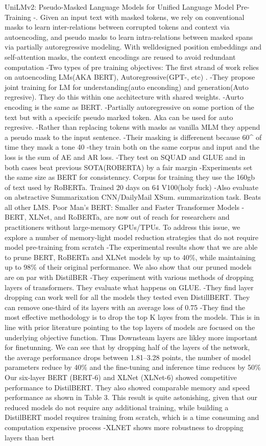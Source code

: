 UniLMv2: Pseudo-Masked Language Models for Unified Language Model Pre-Training
-. Given an input text with
masked tokens, we rely on conventional masks
to learn inter-relations between corrupted tokens
and context via autoencoding, and pseudo masks
to learn intra-relations between masked spans
via partially autoregressive modeling. With welldesigned position embeddings and self-attention
masks, the context encodings are reused to avoid
redundant computation
-Two types of pre training objectives: The first strand of work relies on autoencoding LMs(AKA BERT),  Autoregressive(GPT-, etc) .
-They propose joint training for LM for understanding(auto enconding) and generation(Auto regresive). They do this within one acchitecture with shared weights.  
-Aurto encoding is the same as BERT.
-Partially autoregressive on some portion of the text but with a specicifc pseudo marked token. Aka can be used for auto regresive. 
-Rather than replacing tokens  with masks as vanilla MLM they append a pseudo mask to the input sentence. 
-Their masking is differenent because 60^ of time they mask a tone 40%
-they train both on the same corpus and input and the loss is the sum of AE and AR loss. 
-They test on SQUAD and GLUE and in both cases beat previous SOTA(ROBERTA) by a fair margin
-Experiments set the same size as BERT for consistenncy. Corpus for training they use the 160gb of text used by RoBERTa. Trained 20 days on 64 V100(holy fuck)
-Also evaluate on abstractive Summarixation CNN/DailyMail XSum. summarization task. Beats all other LMS.
Poor Man’s BERT: Smaller and Faster Transformer Models
-BERT, XLNet, and RoBERTa, are
now out of reach for researchers and practitioners without large-memory GPUs/TPUs. To
address this issue, we explore a number of
memory-light model reduction strategies that
do not require model pre-training from scratch
-The experimental results show that we are able
to prune BERT, RoBERTa and XLNet models
by up to 40\%, while maintaining up to 98\% of
their original performance. We also show that
our pruned models are on par with DistilBER
-They experiment with various methods of dropping layers of transformers. They evaluate what happens on GLUE.
-They find layer dropping can work well for all the models they tested even DistillBERT. They can remove one-third of its layers with an average loss of 0.75%
-They find the most effective methodology is to drop the top K layes from the models. This is in line with prior literature pointing to the top layers of models are focused on the underlying objective function. Thus Downsteam layers are likley more important for finetunning.
We can see
that by dropping half of the layers of the network,
the average performance drops between 1.81–3.28
points, the number of model parameters reduce by
40\% and the fine-tuning and inference time reduces
by 50\%
Our six-layer BERT (BERT-6) and XLNet (XLNet-6) showed competitive performance to
DistilBERT. They also showed comparable memory and speed performance as shown in Table 3.
This result is quite astonishing, given that our reduced models do not require any additional training, while building a DistilBERT model requires
training from scratch, which is a time consuming
and computation expensive process
-XLNET shows more robustness to dropping layers than bert

